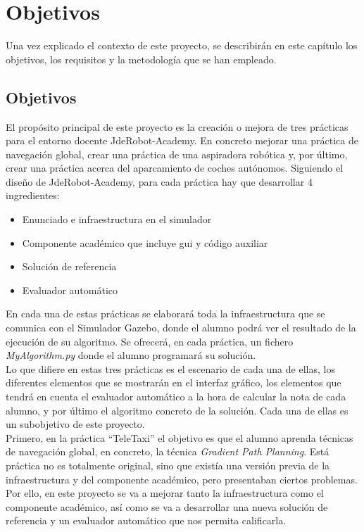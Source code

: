 \chapter{Objetivos}\label{cap.objetivos}
Una vez explicado el contexto de este proyecto, se describirán en este capítulo los objetivos, los requisitos y la metodología que se han empleado.\\

\section{Objetivos}

El propósito principal de este proyecto es la creación o mejora de tres prácticas para el entorno docente JdeRobot-Academy. En concreto mejorar una práctica de navegación global, crear una práctica de una aspiradora robótica y, por último, crear una práctica acerca del aparcamiento de coches autónomos. Siguiendo el diseño de JdeRobot-Academy, para cada práctica hay que desarrollar 4 ingredientes:

\begin{itemize}
\item Enunciado e infraestructura en el simulador
\item Componente académico que incluye \acrshort{gui} y código auxiliar
\item Solución de referencia
\item Evaluador automático
\end{itemize}

En cada una de estas prácticas se elaborará toda la infraestructura que se comunica con el Simulador Gazebo, donde el alumno podrá ver el resultado de la ejecución de su algoritmo. Se ofrecerá, en cada práctica, un fichero \textit{MyAlgorithm.py} donde el alumno programará su solución.\\

Lo que difiere en estas tres prácticas es el escenario de cada una de ellas, los diferentes elementos que se mostrarán en el interfaz gráfico, los elementos que tendrá en cuenta el evaluador automático a la hora de calcular la nota de cada alumno, y por último el algoritmo concreto de la solución. Cada una de ellas es un subobjetivo de este proyecto.\\

Primero, en la práctica ``TeleTaxi'' el objetivo es que el alumno aprenda técnicas de navegación global, en concreto, la técnica \textit{Gradient Path Planning}. Está práctica no es totalmente original, sino que existía una versión previa de la infraestructura y del componente académico, pero presentaban ciertos problemas. Por ello, en este proyecto se va a mejorar tanto la infraestructura como el componente académico, así como se va a desarrollar una nueva solución de referencia y un evaluador automático que nos permita calificarla.\\

